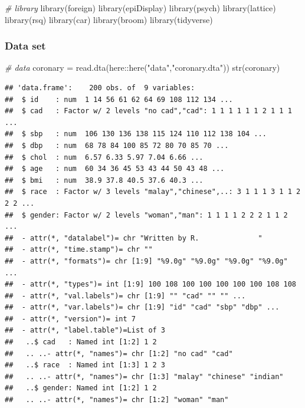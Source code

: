 \documentclass[
]{book}
\makeatletter
\newenvironment{Shaded}{\begin{snugshade}}{\end{snugshade}}
\newcommand{\CommentTok}[1]{\textcolor[rgb]{0.37,0.37,0.37}{\textit{#1}}}
\newcommand{\FunctionTok}[1]{\textcolor[rgb]{0,0,0}{#1}}
\newcommand{\NormalTok}[1]{#1}
\newcommand{\OtherTok}[1]{\textcolor[rgb]{0.37,0.37,0.37}{#1}}
\newcommand{\SpecialCharTok}[1]{\textcolor[rgb]{0,0,0}{#1}}
\newcommand{\StringTok}[1]{\textcolor[rgb]{0.5,0.5,0.5}{#1}}
\newenvironment{kframe}{%
\medskip{}
\setlength{\fboxsep}{.8em}
 \def\at@end@of@kframe{}%
 \ifinner\ifhmode%
  \def\at@end@of@kframe{\end{minipage}}%
  \begin{minipage}{\columnwidth}%
 \fi\fi%
 \def\FrameCommand##1{\hskip\@totalleftmargin \hskip-\fboxsep
 \colorbox{shadecolor}{##1}\hskip-\fboxsep
     \hskip-\linewidth \hskip-\@totalleftmargin \hskip\columnwidth}%
 \MakeFramed {\advance\hsize-\width
   \@totalleftmargin\z@ \linewidth\hsize
   \@setminipage}}%
 {\par\unskip\endMakeFramed%
 \at@end@of@kframe}
\renewenvironment{Shaded}{\begin{kframe}}{\end{kframe}}
\makeatother
\begin{document}
\begin{Shaded}
\begin{Highlighting}[]
\CommentTok{\# library}
\FunctionTok{library}\NormalTok{(foreign)}
\FunctionTok{library}\NormalTok{(epiDisplay)}
\FunctionTok{library}\NormalTok{(psych)}
\FunctionTok{library}\NormalTok{(lattice)}
\FunctionTok{library}\NormalTok{(rsq)}
\FunctionTok{library}\NormalTok{(car)}
\FunctionTok{library}\NormalTok{(broom)}
\FunctionTok{library}\NormalTok{(tidyverse)}
\end{Highlighting}
\end{Shaded}

\hypertarget{data-set}{%
\subsubsection{Data set}\label{data-set}}

\begin{Shaded}
\begin{Highlighting}[]
\CommentTok{\# data}
\NormalTok{coronary }\OtherTok{=} \FunctionTok{read.dta}\NormalTok{(here}\SpecialCharTok{::}\FunctionTok{here}\NormalTok{(}\StringTok{"data"}\NormalTok{,}\StringTok{"coronary.dta"}\NormalTok{))}
\FunctionTok{str}\NormalTok{(coronary)}
\end{Highlighting}
\end{Shaded}

\begin{verbatim}
## 'data.frame':    200 obs. of  9 variables:
##  $ id    : num  1 14 56 61 62 64 69 108 112 134 ...
##  $ cad   : Factor w/ 2 levels "no cad","cad": 1 1 1 1 1 1 2 1 1 1 ...
##  $ sbp   : num  106 130 136 138 115 124 110 112 138 104 ...
##  $ dbp   : num  68 78 84 100 85 72 80 70 85 70 ...
##  $ chol  : num  6.57 6.33 5.97 7.04 6.66 ...
##  $ age   : num  60 34 36 45 53 43 44 50 43 48 ...
##  $ bmi   : num  38.9 37.8 40.5 37.6 40.3 ...
##  $ race  : Factor w/ 3 levels "malay","chinese",..: 3 1 1 1 3 1 1 2 2 2 ...
##  $ gender: Factor w/ 2 levels "woman","man": 1 1 1 1 2 2 2 1 1 2 ...
##  - attr(*, "datalabel")= chr "Written by R.              "
##  - attr(*, "time.stamp")= chr ""
##  - attr(*, "formats")= chr [1:9] "%9.0g" "%9.0g" "%9.0g" "%9.0g" ...
##  - attr(*, "types")= int [1:9] 100 108 100 100 100 100 100 108 108
##  - attr(*, "val.labels")= chr [1:9] "" "cad" "" "" ...
##  - attr(*, "var.labels")= chr [1:9] "id" "cad" "sbp" "dbp" ...
##  - attr(*, "version")= int 7
##  - attr(*, "label.table")=List of 3
##   ..$ cad   : Named int [1:2] 1 2
##   .. ..- attr(*, "names")= chr [1:2] "no cad" "cad"
##   ..$ race  : Named int [1:3] 1 2 3
##   .. ..- attr(*, "names")= chr [1:3] "malay" "chinese" "indian"
##   ..$ gender: Named int [1:2] 1 2
##   .. ..- attr(*, "names")= chr [1:2] "woman" "man"
\end{verbatim}
\end{document}
